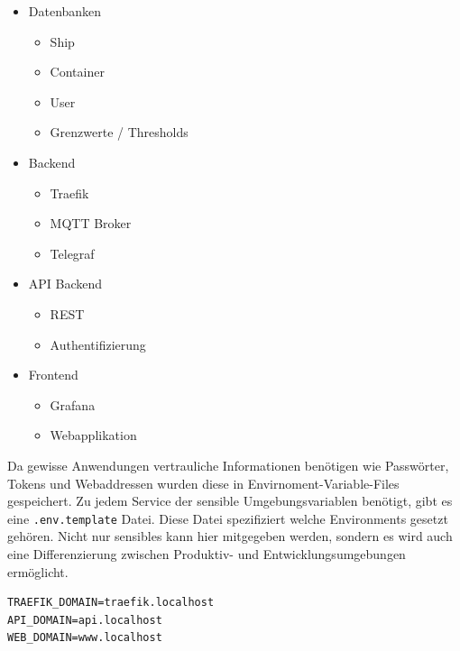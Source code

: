 \documentclass[
    headings=optiontotocandhead,%
    twoside,
    numbers=noenddot,%
    12pt, %
    titlepage, %
    parskip=full, %
    listof=leveldown, 
    numbers=noenddot, %
    a4paper,DIV=14,
    BCOR=15mm,
]{scrbook}
\newcommand{\passthrough}[1]{#1}
\providecommand{\tightlist}{%
  \setlength{\itemsep}{0pt}\setlength{\parskip}{0pt}}
\begin{document}
\begin{itemize}
\tightlist
\item
  Datenbanken

  \begin{itemize}
  \tightlist
  \item
    Ship
  \item
    Container
  \item
    User
  \item
    Grenzwerte / Thresholds
  \end{itemize}
\item
  Backend

  \begin{itemize}
  \tightlist
  \item
    Traefik
  \item
    MQTT Broker
  \item
    Telegraf
  \end{itemize}
\item
  API Backend

  \begin{itemize}
  \tightlist
  \item
    REST
  \item
    Authentifizierung
  \end{itemize}
\item
  Frontend

  \begin{itemize}
  \tightlist
  \item
    Grafana
  \item
    Webapplikation
  \end{itemize}
\end{itemize}

Da gewisse Anwendungen vertrauliche Informationen benötigen wie
Passwörter, Tokens und Webaddressen wurden diese in
Envirnoment-Variable-Files gespeichert. Zu jedem Service der sensible
Umgebungsvariablen benötigt, gibt es eine
\passthrough{\lstinline!.env.template!} Datei. Diese Datei spezifiziert
welche Environments gesetzt gehören. Nicht nur sensibles kann hier
mitgegeben werden, sondern es wird auch eine Differenzierung zwischen
Produktiv- und Entwicklungsumgebungen ermöglicht.

\begin{lstlisting}[caption={Definition einer Entwicklungsumgebung mittels Umgebungsvariablen}]
TRAEFIK_DOMAIN=traefik.localhost
API_DOMAIN=api.localhost
WEB_DOMAIN=www.localhost
\end{lstlisting}
\end{document}
